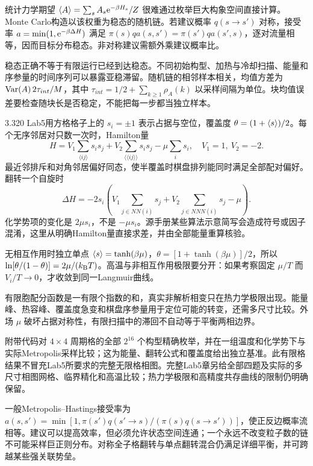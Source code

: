 \label{chap:mc}
统计力学期望 $\langle A\rangle=\sum_sA_s\mathrm e^{-\beta H_s}/Z$ 很难通过枚举巨大构象空间直接计算。Monte Carlo构造以该权重为稳态的随机链。若建议概率 $q(s\to s')$ 对称，接受率 $a=\min(1,\mathrm e^{-\beta\Delta H})$ 满足 $\pi(s)qa(s,s')=\pi(s')qa(s',s)$，逐对流量相等，因而目标分布稳态。非对称建议需额外乘建议概率比。

稳态正确不等于有限运行已经到达稳态。不同初始构型、加热与冷却扫描、能量和序参量的时间序列可以暴露亚稳滞留。随机链的相邻样本相关，均值方差为 $\operatorname{Var}(A)\,2\tau_{int}/M$，其中 $\tau_{int}=1/2+\sum_{k\ge1}\rho_A(k)$ 以采样间隔为单位。块均值误差要检查随块长是否稳定，不能把每一步都当独立样本。

3.320 Lab5用方格格子上的 $s_i=\pm1$ 表示占据与空位，覆盖度 $\theta=(1+\langle s\rangle)/2$。每个无序邻居对只数一次时，Hamilton量
\[
H=V_1\sum_{\langle ij\rangle}s_is_j+V_2\sum_{\langle\!\langle ij\rangle\!\rangle}s_is_j-\mu\sum_is_i,
\quad V_1=1,\ V_2=-2.
\]
最近邻排斥和对角邻居偏好同态，使半覆盖时棋盘排列能同时满足全部配对偏好。翻转一个自旋时
\[
\Delta H=-2s_i\left(V_1\sum_{j\in NN(i)}s_j+V_2\sum_{j\in NNN(i)}s_j-\mu\right).
\]
化学势项的变化是 $2\mu s_i$，不是 $-\mu s_i$。源手册某些算法示意简写会造成符号或因子混淆，这里从明确Hamilton量直接求差，并由全部能量重算核验。

无相互作用时独立单点 $\langle s\rangle=\tanh(\beta\mu)$，$\theta=[1+\tanh(\beta\mu)]/2$，所以 $\ln[\theta/(1-\theta)]=2\mu/(k_{\mathrm B} T)$。高温与非相互作用极限要分开：如果考察固定 $\mu/T$ 而 $V_i/T\to0$，才收敛到同一Langmuir曲线。

有限胞配分函数是一有限个指数的和，真实非解析相变只在热力学极限出现。能量峰、热容峰、覆盖度急变和棋盘序参量用于定位可能的转变，还需多尺寸比较。外场 $\mu$ 破坏占据对称性，有限扫描中的滞回不自动等于平衡两相边界。

附带代码对 $4\times4$ 周期格的全部 $2^{16}$ 个构型精确枚举，并在一组温度和化学势下与实际Metropolis采样比较；这为能量、翻转公式和覆盖度给出独立基准。此有限格结果不冒充Lab5所要求的完整无限格相图。完整Lab5章另给全部四题及实际的多尺寸相图网格、临界精化和高温比较；热力学极限和高精度共存曲线的限制仍明确保留。

一般Metropolis--Hastings接受率为 $a(s,s')=\min[1,\pi(s')q(s'\to s)/(\pi(s)q(s\to s'))]$，使正反边概率流相等。建议可以提高效率，但必须允许状态空间连通；一个永远不改变粒子数的链不可能采样巨正则分布。对称全子格翻转与单点翻转混合仍满足详细平衡，并可跨越某些强关联势垒。

